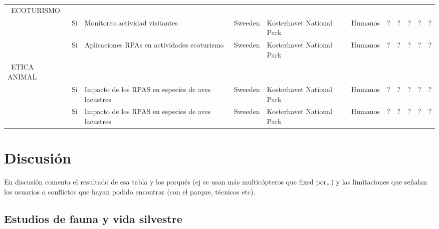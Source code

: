 \documentclass[9t,twocolumn]{article}
\begin{document}
\begin{sidewaystable}
\begin{tabular}{p{2.5cm}p{1cm}p{3cm}p{1cm}p{2cm}p{2cm}p{1cm}p{2cm}p{2cm}p{1cm}p{0.5cm}}
  
  \ ECOTURISMO  \\
  
  \cite{Hansen2016} & Si  & Monitoreo actividad visitantes  & Sweeden & Kosterhavet National Park &  Humanos  & ?  & ? & ?  & ? & ?  \\ 
  \cite{King2014} & Si  & Aplicaciones RPAs en actividades ecoturismo   & Sweeden & Kosterhavet National Park &  Humanos  & ?  & ? & ?  & ? & ?  \\ 
  
  
  \ ETICA ANIMAL  \\
  \cite{Vas2015} & Si  & Impacto de los RPAS en especies de aves lacustres  & Sweeden & Kosterhavet National Park &  Humanos  & ?  & ? & ?  & ? & ?  \\ 
  \cite{Ditmer2015} & Si  & Impacto de los RPAS en especies de aves lacustres  & Sweeden & Kosterhavet National Park &  Humanos  & ?  & ? & ?  & ? & ?  \\ 

  
  \end{tabular}
  \end{sidewaystable}

\section{Discusión}\label{discusion}

En discusión comenta el resultado de esa tabla y los porqués (ej se usan
más multicópteros que fixed por\ldots{}) y las limitaciones que señalan
los usuarios o conflictos que hayan podido encontrar (con el parque,
técnicos etc).

\subsection{Estudios de fauna y vida
silvestre}\label{estudios-de-fauna-y-vida-silvestre}
\end{document}
